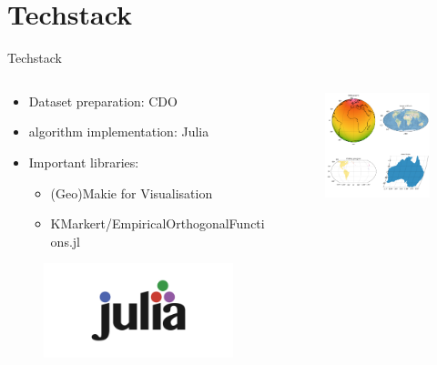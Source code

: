 \section{Techstack}

\begin{frame}{Techstack}

  \begin{columns}
    \begin{column}{.5\columnwidth}
      \begin{itemize}
        \item Dataset preparation: CDO \cite{schulzweida2019cdo}
        \item algorithm implementation: Julia \cite{gao_julia_2020}
        \item Important libraries:
          \begin{itemize}
            \item (Geo)Makie for Visualisation
            \item KMarkert/EmpiricalOrthogonalFunctions.jl
          \end{itemize}
        
      \end{itemize}  
    \begin{figure}[h]
      \centering
      \includegraphics[width=.5 \columnwidth]{imglib/julialang_logo.png}
    \end{figure}
    \end{column}
    \begin{column}{.5\columnwidth}
    \begin{figure}[h]
      \centering
      \includegraphics[width=.7 \columnwidth]{imglib/geomakie_examples.png}
    \end{figure}
      
    \end{column}
  \end{columns}
  
\end{frame}
